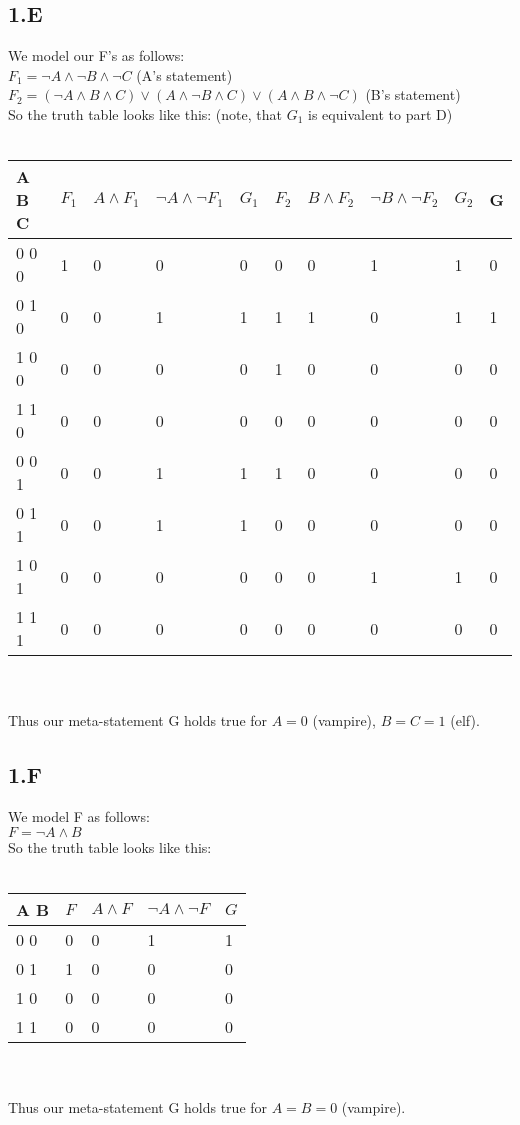 \documentclass[12pt]{article}
\begin{document}
\subsection*{1.E}

We model our F's as follows:\\
$F_1 = \neg A \land \neg B \land \neg C$ (A's statement)\\	
$F_2 = (\neg A \land B \land C) \lor (A \land \neg B \land C) \lor (A \land B \land \neg C)$ (B's statement) \\%
So the truth table looks like this: (note, that $G_1$ is equivalent to part D)\\\\
\begin{tabular}{  l | l | l | l | l | l | l | l | l | l}
	A B C & $F_1$ & $A \land F_1 $ & $\neg A \land \neg F_1$ & $G_1$ & $F_2$ & $B \land F_2 $ & $\neg B \land \neg F_2$ & $G_2$ & G\\ \hline
	0 0 0 & 1 & 0 & 0 & 0 & 0 & 0 & 1 & 1 & 0 \\
	0 1 0 & 0 & 0 & 1 & 1 & 1 & 1 & 0 & 1 & 1 \\
	1 0 0 & 0 & 0 & 0 & 0 & 1 & 0 & 0 & 0 & 0 \\
	1 1 0 & 0 & 0 & 0 & 0 & 0 & 0 & 0 & 0 & 0 \\
	0 0 1 & 0 & 0 & 1 & 1 & 1 & 0 & 0 & 0 & 0 \\
	0 1 1 & 0 & 0 & 1 & 1 & 0 & 0 & 0 & 0 & 0 \\
	1 0 1 & 0 & 0 & 0 & 0 & 0 & 0 & 1 & 1 & 0 \\
	1 1 1 & 0 & 0 & 0 & 0 & 0 & 0 & 0 & 0 & 0 \\
\end{tabular} \\\\
Thus our meta-statement G holds true for $A=0$ (vampire), $B=C=1$ (elf).

\subsection*{1.F}

We model F as follows:\\
$F = \neg A \land B$ \\
So the truth table looks like this:\\\\
\begin{tabular}{  l | l | l | l | l}
	A B & $F$ & $A \land F $ & $\neg A \land \neg F$ & $G$ \\ \hline
	0 0 & 0 & 0 & 1 & 1 \\
	0 1 & 1 & 0 & 0 & 0 \\
	1 0 & 0 & 0 & 0 & 0 \\
	1 1 & 0 & 0 & 0 & 0 \\
\end{tabular} \\\\
Thus our meta-statement G holds true for $A=B=0$ (vampire).
\end{document}
